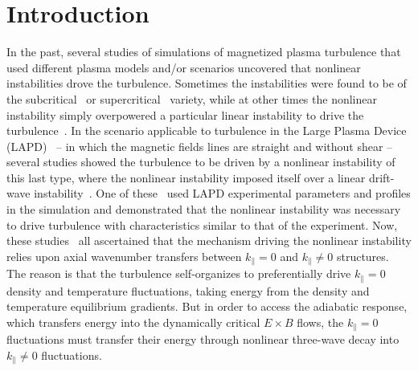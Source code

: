 \documentclass[showpacs,preprintnumbers,amsmath,amssymb,superscriptaddress,aip]{revtex4-1}
\def\para{\parallel}
\begin{document}
\section{Introduction}

In the past, several studies of simulations of magnetized plasma turbulence that used different plasma models and/or scenarios uncovered that nonlinear instabilities drove the turbulence. 
Sometimes the instabilities were found to be of the subcritical~\cite{waltz1985,scott1990,scott1992,nordman1993,itoh1996,highcock2012} or supercritical~\cite{dimits2000,ernst2004} variety, 
while at other times the nonlinear instability simply overpowered a particular linear instability to drive the 
turbulence~\cite{biskamp1995,drake1995,zeiler1996,zeiler1997,korsholm1999,scott2002,scott2003,scott2005,friedman2012b}. In the scenario applicable to turbulence in
the Large Plasma Device (LAPD)~\cite{Gekelman1991} -- in which the magnetic fields lines are straight and without shear -- several studies showed the turbulence to be driven by a nonlinear instability
of this last type, where the nonlinear instability imposed itself over a linear drift-wave instability~\cite{biskamp1995,drake1995,korsholm1999,friedman2012b}. 
One of these~\cite{friedman2012b} used LAPD experimental parameters and profiles in the simulation and demonstrated
that the nonlinear instability was necessary to drive turbulence with characteristics similar to that of the experiment.
Now, these studies~\cite{biskamp1995,drake1995,korsholm1999,friedman2012b} all ascertained
that the mechanism driving the nonlinear instability relies upon axial wavenumber transfers between $k_\para = 0$ and $k_\para \ne 0$ structures. The reason is that the turbulence self-organizes
to preferentially drive $k_\para = 0$ density and temperature fluctuations, taking energy from the density and temperature equilibrium gradients. But in order to access the adiabatic response,
which transfers energy into the dynamically critical $E \times B$ flows, the $k_\para = 0$ fluctuations must transfer their energy through nonlinear three-wave decay into $k_\para \ne 0$ fluctuations.
\end{document}
